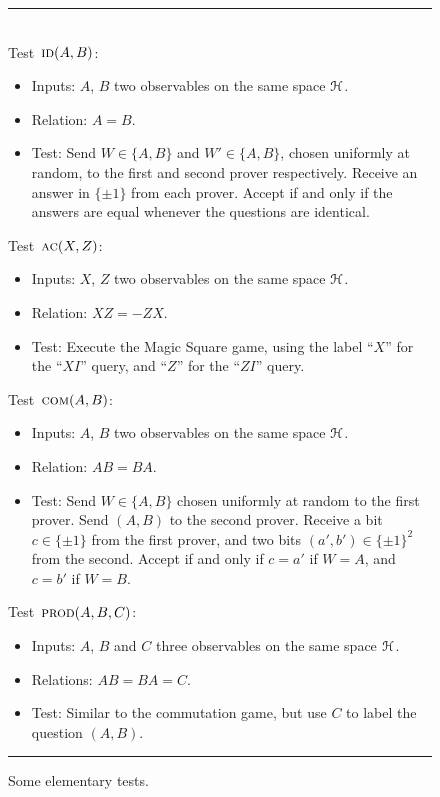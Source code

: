 \begin{figure}[H]
\rule[1ex]{\textwidth}{0.5pt}\\
\justifying
Test~$\textsc{id}(A,B)$:
\begin{itemize}
    \item Inputs: $A$, $B$ two observables on the same space $\mathcal{H}$.
    \item Relation: $A=B$.
    \item Test: Send $W \in \{A,B\}$ and $W'\in\{A,B\}$, chosen uniformly at random, to the first and second prover respectively. Receive an answer in $\{\pm 1\}$ from each prover. Accept if and only if the answers are equal whenever the questions are identical. 
\end{itemize}

Test~$\textsc{ac}(X,Z)$:
\begin{itemize}
    \item Inputs: $X$, $Z$ two observables on the same space $\mathcal{H}$.
    \item Relation: $XZ=-ZX$.
    \item Test: Execute the Magic Square game, using the label ``$X$'' for the ``$XI$'' query, and ``$Z$'' for the ``$ZI$'' query.  
\end{itemize}

Test~$\textsc{com}(A,B)$:
\begin{itemize}
    \item Inputs: $A$, $B$ two observables on the same space $\mathcal{H}$.
    \item Relation: $AB=BA$.
    \item Test: Send $W\in\{A,B\}$ chosen uniformly at random to the first prover. Send $(A,B)$ to the second prover. Receive a bit $c\in\{\pm 1\}$ from the first prover, and two bits $(a',b')\in\{\pm 1\}^2$ from the second. Accept if and only if $c=a'$ if $W=A$, and $c=b'$ if $W=B$. 
\end{itemize}

Test~$\textsc{prod}(A,B,C)$:
\begin{itemize}
    \item Inputs: $A$, $B$ and $C$ three observables on the same space $\mathcal{H}$.
    \item Relations: $AB=BA=C$.
    \item Test: Similar to the commutation game, but use $C$ to label the question $(A,B)$.
\end{itemize}
\rule[2ex]{\textwidth}{0.5pt}\vspace{-.5cm}
\caption{Some elementary tests.}
\label{fig:elementary}
\end{figure}


